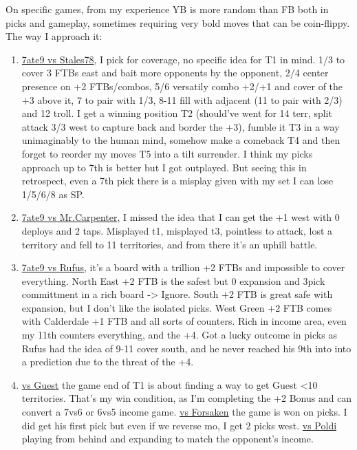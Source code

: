 On specific games, from my experience YB is more random than FB both in picks and gameplay, sometimes requiring very bold moves that can be coin-flippy. The way I approach it:
\begin{enumerate}
    \item \href{https://www.warzone.com/MultiPlayer?GameID=41377144}{7ate9 vs Stales78}, I pick for coverage, no specific idea for T1 in mind. 1/3 to cover 3 FTBs east and bait more opponents by the opponent, 2/4 center presence on +2 FTBs/combos, 5/6 versatily combo +2/+1 and cover of the +3 above it, 7 to pair with 1/3, 8-11 fill with adjacent (11 to pair with 2/3) and 12 troll. I get a winning position T2 (should've went for 14 terr, split attack 3/3 west to capture back and border the +3), fumble it T3 in a way unimaginably to the human mind, somehow make a comeback T4 and then forget to reorder my moves T5 into a tilt surrender. I think my picks approach up to 7th is better but I got outplayed. But seeing this in retrospect, even a 7th pick there is a misplay given with my set I can lose 1/5/6/8 as SP.
    \item \href{https://www.warzone.com/MultiPlayer?GameID=41343286}{7ate9 vs Mr.Carpenter}, I missed the idea that I can get the +1 west with 0 deploys and 2 taps. Misplayed t1, misplayed t3, pointless to attack, lost a territory and fell to 11 territories, and from there it's an uphill battle. 
    \item \href{https://www.warzone.com/MultiPlayer?GameID=41343983}{7ate9 vs Rufus}, it's a board with a trillion +2 FTBs and impossible to cover everything. North East +2 FTB is the safest but 0 expansion and 3pick committment in a rich board -> Ignore. South +2 FTB is great safe with expansion, but I don't like the isolated picks. West Green +2 FTB comes with Calderdale +1 FTB and all sorts of counters. Rich in income area, even my 11th counters everything, and the +4. Got a lucky outcome in picks as Rufus had the idea of 9-11 cover south, and he never reached his 9th into into a prediction due to the threat of the +4.
    \item \href{https://www.warzone.com/MultiPlayer?GameID=39713419}{vs Guest} the game end of T1 is about finding a way to get Guest <10 territories. That's my win condition, as I'm completing the +2 Bonus and can convert a 7vs6 or 6vs5 income game. \href{https://www.warzone.com/MultiPlayer?GameID=39755538}{vs Forsaken} the game is won on picks. I did get his first pick but even if we reverse mo, I get 2 picks west. \href{https://www.warzone.com/MultiPlayer?GameID=38007899}{vs Poldi} playing from behind and expanding to match the opponent's income.
\end{enumerate}


